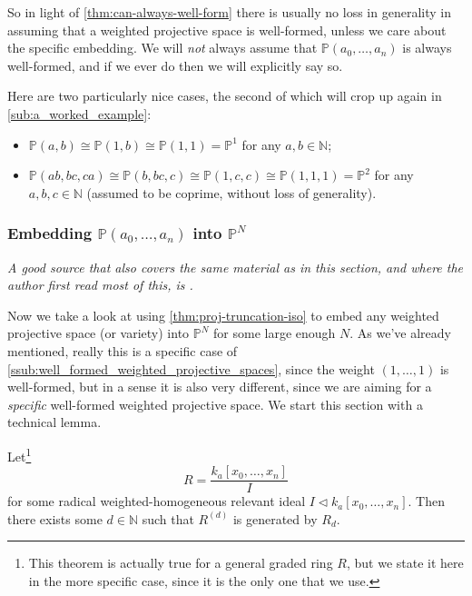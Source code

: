 \documentclass[10pt,notitlepage]{article}
\numberwithin{equation}{subsection}
\newcommand{\pee}{\mathbb{P}}
\newcommand{\nn}{\mathbb{N}}
\newcommand{\kazn}{k_a[x_0,\ldots,x_n]}
\newcommand{\pazn}{\pee(a_0,\ldots,a_n)}
\begin{document}
        So in light of \cref{thm:can-always-well-form} there is usually no loss in generality in assuming that a weighted projective space is well-formed, unless we care about the specific embedding.
        We will \emph{not} always assume that $\pazn$ is always well-formed, and if we ever do then we will explicitly say so.

        \begin{example}
            Here are two particularly nice cases, the second of which will crop up again in \cref{sub:a_worked_example}:
            \begin{itemize}
                \item $\pee(a,b)\cong\pee(1,b)\cong\pee(1,1)=\pee^1$ for any $a,b\in\nn$;
                \item $\pee(ab,bc,ca)\cong\pee(b,bc,c)\cong\pee(1,c,c)\cong\pee(1,1,1)=\pee^2$ for any $a,b,c\in\nn$ (assumed to be coprime, without loss of generality).\qedhere
            \end{itemize}
        \end{example}
        



        \subsubsection{Embedding \texorpdfstring{$\pee(a_0,\ldots,a_n)$}{P(a0,...,an)} into \texorpdfstring{$\pee^N$}{PN}} %
        \label{subsub:embedding_}


        \emph{A good source that also covers the same material as in this section, and where the author first read most of this, is \cite[Section~5.5]{Tevelev:jdT35_ao}.}

        \bigskip

        Now we take a look at using \cref{thm:proj-truncation-iso} to embed any weighted projective space (or variety) into $\pee^N$ for some large enough $N$.
        As we've already mentioned, really this is a specific case of \cref{ssub:well_formed_weighted_projective_spaces}, since the weight $(1,\ldots,1)$ is well-formed, but in a sense it is also very different, since we are aiming for a \emph{specific} well-formed weighted projective space.
        We start this section with a technical lemma.

        \begin{lemma}\label{lem:suffic-large-d}
            Let\footnote{%
                This theorem is actually true for a general graded ring $R$, but we state it here in the more specific case, since it is the only one that we use.
            }
            \[
                R=\frac{\kazn}{I}
            \]
            for some radical weighted-homogeneous relevant ideal $I\triangleleft\kazn$.
            Then there exists some $d\in\nn$ such that $R^{(d)}$ is generated by $R_d$.
        \end{lemma}
\end{document}
